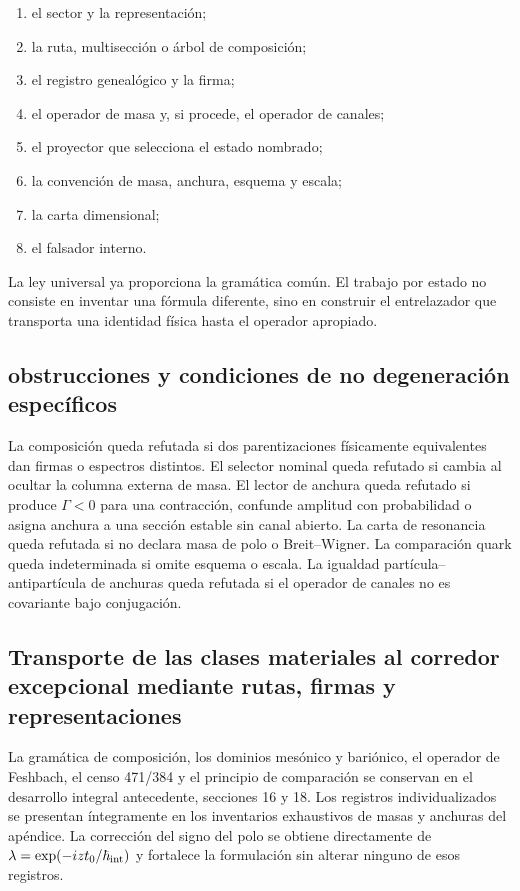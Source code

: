 \begin{enumerate}
\item el sector y la representación;
\item la ruta, multisección o árbol de composición;
\item el registro genealógico y la firma;
\item el operador de masa y, si procede, el operador de canales;
\item el proyector que selecciona el estado nombrado;
\item la convención de masa, anchura, esquema y escala;
\item la carta dimensional;
\item el falsador interno.
\end{enumerate}
La ley universal ya proporciona la gramática común. El trabajo por estado no consiste en inventar una fórmula diferente, sino en construir el entrelazador que transporta una identidad física hasta el operador apropiado.

\subsection{obstrucciones y condiciones de no degeneración específicos}
La composición queda refutada si dos parentizaciones físicamente equivalentes dan firmas o espectros distintos. El selector nominal queda refutado si cambia al ocultar la columna externa de masa. El lector de anchura queda refutado si produce \(\Gamma<0\) para una contracción, confunde amplitud con probabilidad o asigna anchura a una sección estable sin canal abierto. La carta de resonancia queda refutada si no declara masa de polo o Breit--Wigner. La comparación quark queda indeterminada si omite esquema o escala. La igualdad partícula--antipartícula de anchuras queda refutada si el operador de canales no es covariante bajo conjugación.

\subsection{Transporte de las clases materiales al corredor excepcional mediante rutas, firmas y representaciones}
La gramática de composición, los dominios mesónico y bariónico, el operador de Feshbach, el censo 471/384 y el principio de comparación se conservan en el desarrollo integral antecedente, secciones 16 y 18. Los registros individualizados se presentan íntegramente en los inventarios exhaustivos de masas y anchuras del apéndice. La corrección del signo del polo se obtiene directamente de \(\lambda=\exp(-izt_0/\hbar_{\rm int})\) y fortalece la formulación sin alterar ninguno de esos registros.

